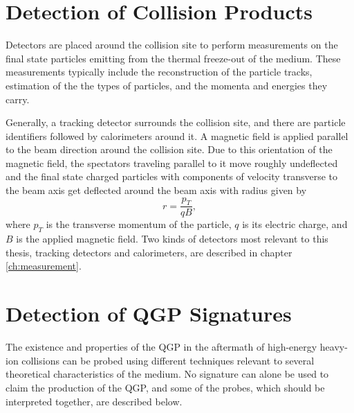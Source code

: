 \section{Detection of Collision Products}\label{subsection:detection}
Detectors are placed around the collision site to perform measurements on the final state particles emitting from the thermal freeze-out of the medium. These measurements typically include the reconstruction of the particle tracks, estimation of the the types of particles, and the momenta and energies they carry.

Generally, a tracking detector surrounds the collision site, and there are particle identifiers followed by calorimeters around it. A magnetic field is applied parallel to the beam direction around the collision site. Due to this orientation of the magnetic field, the spectators traveling parallel to it move roughly undeflected and the final state charged particles with components of velocity transverse to the beam axis get deflected around the beam axis with radius given by
\begin{equation}\label{eqn:larmor}
r = \frac{p_{T}}{qB},
\end{equation}
where $p_{T}$ is the transverse momentum of the particle, $q$ is its electric charge, and $B$ is the applied magnetic field.
Two kinds of detectors most relevant to this thesis, tracking detectors and calorimeters, are described in chapter \ref{ch:measurement}.

\section{Detection of QGP Signatures}\label{section:signatures}

The existence and properties of the QGP in the aftermath of high-energy heavy-ion collisions can be probed using different techniques relevant to several theoretical characteristics of the medium. No signature can alone be used to claim the production of the QGP, and some of the probes, which should be interpreted together, are described below.



